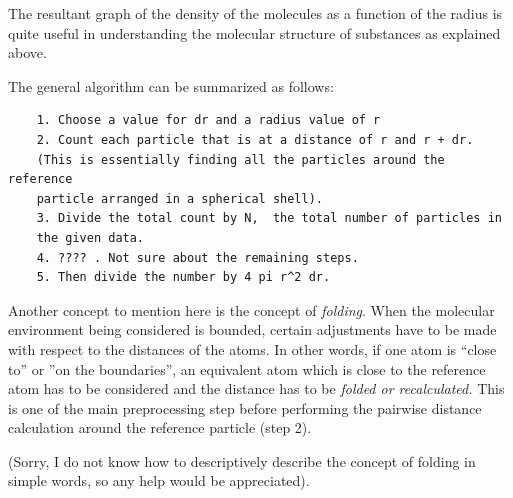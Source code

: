 The resultant graph of the density of the molecules as a function of the radius is quite useful in understanding the molecular structure of substances as explained above. 

The general algorithm can be summarized as follows:

\begin{verbatim}
    1. Choose a value for dr and a radius value of r
    2. Count each particle that is at a distance of r and r + dr. 
    (This is essentially finding all the particles around the reference 
    particle arranged in a spherical shell).
    3. Divide the total count by N,  the total number of particles in 
    the given data.
    4. ???? . Not sure about the remaining steps.
    5. Then divide the number by 4 pi r^2 dr.    
\end{verbatim}

Another concept to mention here is the concept of \textit{folding}. When the molecular environment being considered is bounded, certain adjustments have to be made with respect to the distances of the atoms. In other words, if one atom is ``close to'' or ''on the boundaries'', an equivalent atom which is close to the reference atom has to be considered and the distance has to be \textit{folded or recalculated.} This is one of the main preprocessing step before performing the pairwise distance calculation around the reference particle (step 2). 

(Sorry, I do not know how to descriptively describe the concept of folding in simple words, so any help would be appreciated). 
